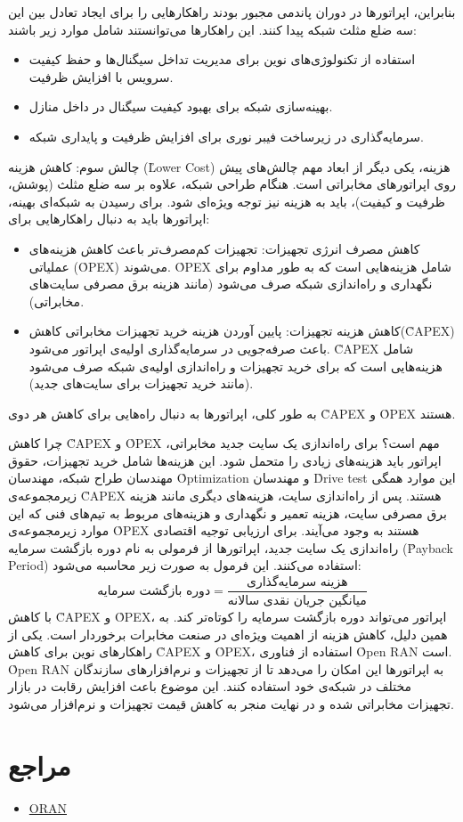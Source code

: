 \documentclass[landscape, 12pt]{report}
\begin{document}
بنابراین، اپراتورها در دوران پاندمی مجبور بودند راهکارهایی را برای ایجاد تعادل بین این سه ضلع مثلث شبکه پیدا کنند. این راهکارها می‌توانستند شامل موارد زیر باشند:
\begin{itemize}
\item استفاده از تکنولوژی‌های نوین برای مدیریت تداخل سیگنال‌ها و حفظ کیفیت سرویس با افزایش ظرفیت.
\item بهینه‌سازی شبکه برای بهبود کیفیت سیگنال در داخل منازل.
\item سرمایه‌گذاری در زیرساخت فیبر نوری برای افزایش ظرفیت و پایداری شبکه.
\end{itemize}

چالش سوم: کاهش هزینه (\r{Lower Cost})
هزینه، یکی دیگر از ابعاد مهم چالش‌های پیش روی اپراتورهای مخابراتی است. هنگام طراحی شبکه، علاوه بر سه ضلع مثلث (پوشش، ظرفیت و کیفیت)، باید به هزینه نیز توجه ویژه‌ای شود.
برای رسیدن به شبکه‌ای بهینه، اپراتورها باید به دنبال راهکارهایی برای:
\begin{itemize}
\item کاهش مصرف انرژی تجهیزات: تجهیزات کم‌مصرف‌تر باعث کاهش هزینه‌های عملیاتی (\r{OPEX}) می‌شوند. \r{OPEX} شامل هزینه‌هایی است که به طور مداوم برای نگهداری و راه‌اندازی شبکه صرف می‌شود (مانند هزینه برق مصرفی سایت‌های مخابراتی).
\item کاهش هزینه تجهیزات: پایین آوردن هزینه خرید تجهیزات مخابراتی کاهش(\r{CAPEX}) باعث صرفه‌جویی در سرمایه‌گذاری اولیه‌ی اپراتور می‌شود. \r{CAPEX} شامل هزینه‌هایی است که برای خرید تجهیزات و راه‌اندازی اولیه‌ی شبکه صرف می‌شود (مانند خرید تجهیزات برای سایت‌های جدید).
\end{itemize}

به طور کلی، اپراتورها به دنبال راه‌هایی برای کاهش هر دوی \r{CAPEX} و \r{OPEX} هستند.

چرا کاهش \r{CAPEX} و \r{OPEX} مهم است؟
برای راه‌اندازی یک سایت جدید مخابراتی، اپراتور باید هزینه‌های زیادی را متحمل شود. این هزینه‌ها شامل خرید تجهیزات، حقوق مهندسان طراح شبکه، مهندسان \r{Optimization} و مهندسان \r{Drive test} این موارد همگی زیرمجموعه‌ی \r{CAPEX} هستند.
پس از راه‌اندازی سایت، هزینه‌های دیگری مانند هزینه برق مصرفی سایت، هزینه تعمیر و نگهداری و هزینه‌های مربوط به تیم‌های فنی که این موارد زیرمجموعه‌ی \r{OPEX} هستند به وجود می‌آیند.
برای ارزیابی توجیه اقتصادی راه‌اندازی یک سایت جدید، اپراتورها از فرمولی به نام دوره بازگشت سرمایه (\r{Payback Period}) استفاده می‌کنند. این فرمول به صورت زیر محاسبه می‌شود:
\[
\text{دوره بازگشت سرمایه} = \frac{\text{هزینه سرمایه‌گذاری}}{\text{میانگین جریان نقدی سالانه}}
\]
با کاهش \r{CAPEX} و \r{OPEX}، اپراتور می‌تواند دوره بازگشت سرمایه را کوتاه‌تر کند. به همین دلیل، کاهش هزینه از اهمیت ویژه‌ای در صنعت مخابرات برخوردار است.
یکی از راهکارهای نوین برای کاهش \r{CAPEX} و \r{OPEX}، استفاده از فناوری \r{Open RAN} است. \r{Open RAN} به اپراتورها این امکان را می‌دهد تا از تجهیزات و نرم‌افزارهای سازندگان مختلف در شبکه‌ی خود استفاده کنند. این موضوع باعث افزایش رقابت در بازار تجهیزات مخابراتی شده و در نهایت منجر به کاهش قیمت تجهیزات و نرم‌افزار می‌شود.









\section* {مراجع}
\begin{itemize}
	\item 
	\href{https://www.youtube.com/watch?v=Z9kJ8HT\_IVM} {ORAN}
	
\end{itemize}
\end{document}
